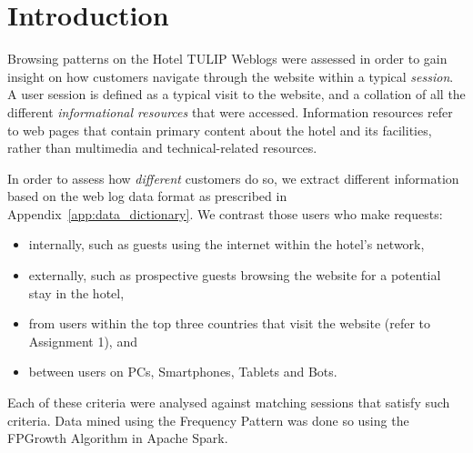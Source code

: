 \section{Introduction}
\label{sec:introduction}

Browsing patterns on the Hotel TULIP Weblogs were assessed in order to gain insight on how customers navigate through the website within a typical \textit{session}. A user session is defined as a typical visit to the website, and a collation of all the different \textit{informational resources} that were accessed. Information resources refer to web pages that contain primary content about the hotel and its facilities, rather than multimedia and technical-related resources.

In order to assess how \emph{different} customers do so, we extract different information based on the web log data format as prescribed in Appendix~\ref{app:data_dictionary}. We contrast those users who make requests:

\begin{itemize}
  \item internally, such as guests using the internet within the hotel's network,
  \item externally, such as prospective guests browsing the website for a potential stay in the hotel,
  \item from users within the top three countries that visit the  website (refer to Assignment 1), and
  \item between users on PCs, Smartphones, Tablets and Bots.
\end{itemize}

Each of these criteria were analysed against matching sessions that satisfy such criteria. Data mined using the Frequency Pattern was done so using the FPGrowth Algorithm in Apache Spark.
